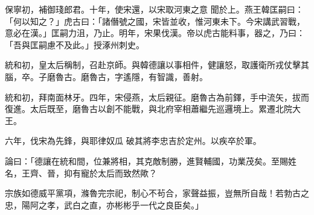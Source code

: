 \begin{pinyinscope}
 保寧初，補御琖郎君。十年，使宋還，以宋取河東之意
 聞於上。燕王韓匡嗣曰：「何以知之？」虎古曰：「諸僭號之國，宋皆並收，惟河東未下。今宋講武習戰，意必在漢。」匡嗣力沮，乃止。明年，宋果伐漢。帝以虎古能料事，器之，乃曰：「吾與匡嗣慮不及此。」授涿州刺史。



 統和初，皇太后稱制，召赴京師。與韓德讓以事相件，健讓怒，取護衛所戎仗擊其腦，卒。子磨魯古。磨魯古，字遙隱，有智識，善射。



 統和初，拜南面林牙。四年，宋侵燕，太后親征。磨魯古為前鐸，手中流矢，拔而復進。太后既至，磨魯古以創不能戰，與北府宰相蕭繼先巡邏境上。累遷北院大王。



 六年，伐宋為先鋒，與耶律奴瓜
 破其將李忠吉於定州。以疾卒於軍。



 論曰：「德讓在統和間，位兼將相，其克敵制勝，進賢輔國，功業茂矣。至賜姓名，王齊、晉，抑有寵於太后而致然歟？



 宗族如德威平黨項，滌魯完宗祀，制心不茍合，家聲益振，豈無所自哉！若勃古之忠，陽阿之孝，武白之直，亦彬彬乎一代之良臣矣。」



\end{pinyinscope}